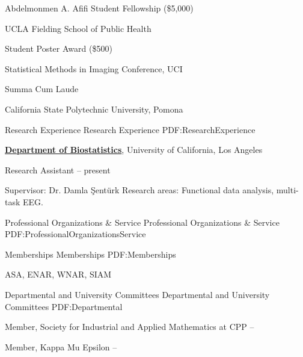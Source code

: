 \documentclass[letterpaper,MMMyyyy,nonstopmode]{simpleresumecv}
\begin{document}
\begin{Body}
Abdelmonmen A. Afifi Student Fellowship (\$5,000) \hfill {}
\begin{Detail} 
UCLA Fielding School of Public Health 
\end{Detail}
\BigGap

Student Poster Award  (\$500) \hfill {}
\begin{Detail} 
Statistical Methods in Imaging Conference, UCI
\end{Detail}
\BigGap

Summa Cum Laude \hfill {}
\begin{Detail} 
California State Polytechnic University, Pomona
\end{Detail}


\Section
{Research Experience}
{Research Experience}
{PDF:ResearchExperience}

\Entry
\href{http://www.example.com/my-institute}
{\textbf{Department of Biostatistics}},
University of California, Los Angeles

Research Assistant
\hfill
{} -- present
\begin{Detail}
\SubBulletItem
Supervisor:
Dr. Damla \c{S}ent\"{u}rk
\SubBulletItem
Research areas:
Functional data analysis, multi-task EEG.
\end{Detail}



\Section
{Professional Organizations\newline
\& Service}
{Professional Organizations \& Service}
{PDF:ProfessionalOrganizationsService}

\SubSection
{Memberships}
{Memberships}
{PDF:Memberships}

\BigGap

ASA, ENAR, WNAR, SIAM

\BigGap

\SubSection 
{Departmental and University Committees}
{Departmental and University Committees} 
{PDF:Departmental} 

\BigGap 

Member, Society for Industrial and Applied Mathematics at CPP \hfill {} -- 

Member, Kappa Mu Epsilon \hfill {} -- 



\end{Body}
\end{document}
